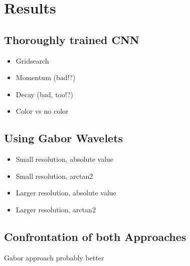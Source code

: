 \documentclass[11pt, a4paper]{article}
\begin{document}
\newpage


\section{Results}

\subsection{Thoroughly trained CNN}

\begin{itemize}
\item Gridsearch
\item Momentum (bad!?)
\item Decay (bad, too!?)
\item Color vs no color
\end{itemize}

\subsection{Using Gabor Wavelets}

\begin{itemize}
\item Small resolution, absolute value
\item Small resolution, arctan2
\item Larger resolution, absolute value
\item Larger resolution, arctan2
\end{itemize}

\subsection{Confrontation of both Approaches}

Gabor approach probably better

\newpage

\end{document}
